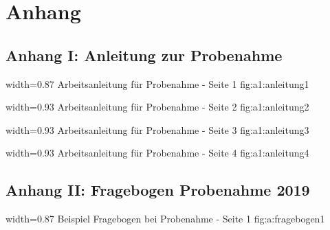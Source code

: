 \section{Anhang}


%

\subsection{Anhang I: Anleitung zur Probenahme}
\label{chap:anhang_Anleitung}

  {width=0.87\textwidth} %
  {Arbeitsanleitung für Probenahme - Seite 1} %
  {} %
  {fig:a1:anleitung1} %
  
  {width=0.93\textwidth} %
  {Arbeitsanleitung für Probenahme - Seite 2} %
  {} %
  {fig:a1:anleitung2} %
  
  {width=0.93\textwidth} %
  {Arbeitsanleitung für Probenahme - Seite 3} %
  {} %
  {fig:a1:anleitung3} %
  
  {width=0.93\textwidth} %
  {Arbeitsanleitung für Probenahme - Seite 4} %
  {} %
  {fig:a1:anleitung4} %

\subsection{Anhang II: Fragebogen Probenahme 2019}
\label{chap:anhang_Fragebogen}
  {width=0.87\textwidth} %
  {Beispiel Fragebogen bei Probenahme - Seite 1} %
  {} %
  {fig:a:fragebogen1} %
  

